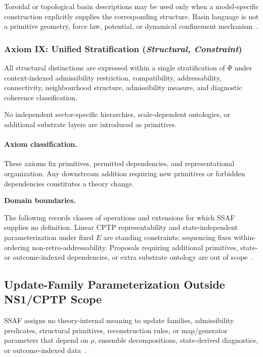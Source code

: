 \documentclass[aps,prx,onecolumn,11pt]{revtex4-2}
\theoremstyle{plain}
\theoremstyle{definition}
\theoremstyle{remark}
\begin{document}
Toroidal or topological basin descriptions may be used only when a
model-specific construction explicitly supplies the corresponding
structure. Basin language is not a primitive geometry, force law,
potential, or dynamical confinement mechanism~\cite{BengtssonZyczkowski2006}.

\subsubsection*{Axiom IX: Unified Stratification
\;(\textit{Structural, Constraint})}
\label{ax:unified_stratification}

All structural distinctions are expressed within a single stratification
of \(\Phi\) under context-indexed admissibility restriction,
compatibility, addressability, connectivity, neighbourhood structure,
admissibility measure, and diagnostic coherence classification.

No independent sector-specific hierarchies, scale-dependent ontologies,
or additional substrate layers are introduced as primitives.

\paragraph*{Axiom classification.}

These axioms fix primitives, permitted dependencies, and
representational organization. Any downstream addition requiring new
primitives or forbidden dependencies constitutes a theory change.

\medskip
\noindent\textbf{Domain boundaries.}

The following records classes of operations and extensions for which
SSAF supplies no definition. Linear CPTP representability and
state-independent parameterization under fixed \(E\) are standing
constraints; sequencing fixes within-ordering non-retro-addressability.
Proposals requiring additional primitives, state- or outcome-indexed
dependencies, or extra substrate ontology are out of
scope~\cite{Watrous2018,NielsenChuang2010,BreuerPetruccione2002}.

\subsection{Update-Family Parameterization Outside NS1/CPTP Scope}
\label{subsec:failure_forbidden_dependencies}

SSAF assigns no theory-internal meaning to update families,
admissibility predicates, structural primitives, reconstruction rules,
or map/generator parameters that depend on \(\rho\), ensemble
decompositions, state-derived diagnostics, or outcome-indexed
data~\cite{Gisin1989,Gisin1990,Polchinski1991,Watrous2018}.
\end{document}
